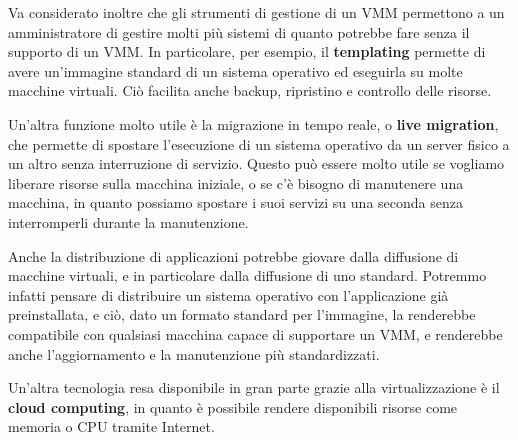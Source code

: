     Va considerato inoltre che gli strumenti di gestione di un VMM permettono a un amministratore di gestire molti più sistemi di quanto potrebbe fare senza il supporto di un VMM. In particolare, per esempio, il \textbf{templating} permette di avere un'immagine standard di un sistema operativo ed eseguirla su molte macchine virtuali. Ciò facilita anche backup, ripristino e controllo delle risorse.
    
    Un'altra funzione molto utile è la migrazione in tempo reale, o \textbf{live migration}, che permette di spostare l'esecuzione di un sistema operativo da un server fisico a un altro senza interruzione di servizio. Questo può essere molto utile se vogliamo liberare risorse sulla macchina iniziale, o se c'è bisogno di manutenere una macchina, in quanto possiamo spostare i suoi servizi su una seconda senza interromperli durante la manutenzione.
    
    Anche la distribuzione di applicazioni potrebbe giovare dalla diffusione di macchine virtuali, e in particolare dalla diffusione di uno standard. Potremmo infatti pensare di distribuire un sistema operativo con l'applicazione già preinstallata, e ciò, dato un formato standard per l'immagine, la renderebbe compatibile con qualsiasi macchina capace di supportare un VMM, e renderebbe anche l'aggiornamento e la manutenzione più standardizzati.
    
    Un'altra tecnologia resa disponibile in gran parte grazie alla virtualizzazione è il \textbf{cloud computing}, in quanto è possibile rendere disponibili risorse come memoria o CPU tramite Internet.
